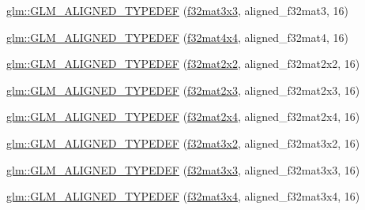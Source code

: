 \begin{DoxyCompactItemize}
\item 
\mbox{\hyperlink{group__gtx__type__aligned_gadd8ddbe2bf65ccede865ba2f510176dc}{glm\+::\+G\+L\+M\+\_\+\+A\+L\+I\+G\+N\+E\+D\+\_\+\+T\+Y\+P\+E\+D\+EF}} (\mbox{\hyperlink{group__gtc__type__precision_ga715b36ea1e2d1ffaaef7517cc78b3877}{f32mat3x3}}, aligned\+\_\+f32mat3, 16)
\item 
\mbox{\hyperlink{group__gtx__type__aligned_gaf18dbff14bf13d3ff540c517659ec045}{glm\+::\+G\+L\+M\+\_\+\+A\+L\+I\+G\+N\+E\+D\+\_\+\+T\+Y\+P\+E\+D\+EF}} (\mbox{\hyperlink{group__gtc__type__precision_gac4a4b2671cbf50ab95c55fce2bfcd811}{f32mat4x4}}, aligned\+\_\+f32mat4, 16)
\item 
\mbox{\hyperlink{group__gtx__type__aligned_ga66339f6139bf7ff19e245beb33f61cc8}{glm\+::\+G\+L\+M\+\_\+\+A\+L\+I\+G\+N\+E\+D\+\_\+\+T\+Y\+P\+E\+D\+EF}} (\mbox{\hyperlink{group__gtc__type__precision_gae7ebbb68656a5fd879d536b5d8452fb1}{f32mat2x2}}, aligned\+\_\+f32mat2x2, 16)
\item 
\mbox{\hyperlink{group__gtx__type__aligned_ga1558a48b3934011b52612809f443e46d}{glm\+::\+G\+L\+M\+\_\+\+A\+L\+I\+G\+N\+E\+D\+\_\+\+T\+Y\+P\+E\+D\+EF}} (\mbox{\hyperlink{group__gtc__type__precision_gac4573d3d213b2bce23943caef565a211}{f32mat2x3}}, aligned\+\_\+f32mat2x3, 16)
\item 
\mbox{\hyperlink{group__gtx__type__aligned_gaa52e5732daa62851627021ad551c7680}{glm\+::\+G\+L\+M\+\_\+\+A\+L\+I\+G\+N\+E\+D\+\_\+\+T\+Y\+P\+E\+D\+EF}} (\mbox{\hyperlink{group__gtc__type__precision_gab0eab14575c18077fd3415539bce685a}{f32mat2x4}}, aligned\+\_\+f32mat2x4, 16)
\item 
\mbox{\hyperlink{group__gtx__type__aligned_gac09663c42566bcb58d23c6781ac4e85a}{glm\+::\+G\+L\+M\+\_\+\+A\+L\+I\+G\+N\+E\+D\+\_\+\+T\+Y\+P\+E\+D\+EF}} (\mbox{\hyperlink{group__gtc__type__precision_ga61653615c76194cdf3454e6e703525e0}{f32mat3x2}}, aligned\+\_\+f32mat3x2, 16)
\item 
\mbox{\hyperlink{group__gtx__type__aligned_ga3f510999e59e1b309113e1d561162b29}{glm\+::\+G\+L\+M\+\_\+\+A\+L\+I\+G\+N\+E\+D\+\_\+\+T\+Y\+P\+E\+D\+EF}} (\mbox{\hyperlink{group__gtc__type__precision_ga715b36ea1e2d1ffaaef7517cc78b3877}{f32mat3x3}}, aligned\+\_\+f32mat3x3, 16)
\item 
\mbox{\hyperlink{group__gtx__type__aligned_ga2c9c94f0c89cd71ce56551db6cf4aaec}{glm\+::\+G\+L\+M\+\_\+\+A\+L\+I\+G\+N\+E\+D\+\_\+\+T\+Y\+P\+E\+D\+EF}} (\mbox{\hyperlink{group__gtc__type__precision_ga9995b357aa1e9603adad780cfde1aa07}{f32mat3x4}}, aligned\+\_\+f32mat3x4, 16)
\item 

\end{DoxyCompactItemize}
